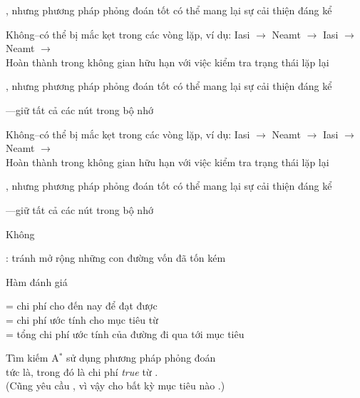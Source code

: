 \documentclass{article}
\def\Astar{A$^*$}
\begin{document}
\begin{huge}
 , nhưng phương pháp phỏng đoán tốt có thể mang lại sự cải thiện đáng kể




 Không--có thể bị mắc kẹt trong các vòng lặp, ví dụ:\nl
Iasi $\rightarrow$ Neamt $\rightarrow$ Iasi $\rightarrow$ Neamt $\rightarrow$\\
Hoàn thành trong không gian hữu hạn với việc kiểm tra trạng thái lặp lại

 , nhưng phương pháp phỏng đoán tốt có thể mang lại sự cải thiện đáng kể

 ---giữ tất cả các nút trong bộ nhớ



 Không--có thể bị mắc kẹt trong các vòng lặp, ví dụ:\nl
Iasi $\rightarrow$ Neamt $\rightarrow$ Iasi $\rightarrow$ Neamt $\rightarrow$\\
Hoàn thành trong không gian hữu hạn với việc kiểm tra trạng thái lặp lại

 , nhưng phương pháp phỏng đoán tốt có thể mang lại sự cải thiện đáng kể

 ---giữ tất cả các nút trong bộ nhớ

 Không


\heading{{\Astar} tìm kiếm}

: tránh mở rộng những con đường vốn đã tốn kém

Hàm đánh giá 

 = chi phí cho đến nay để đạt được \\
 = chi phí ước tính cho mục tiêu từ \\
 = tổng chi phí ước tính của đường đi qua  tới mục tiêu

Tìm kiếm {\Astar} sử dụng phương pháp phỏng đoán \\
tức là,  trong đó  là chi phí \emph{true} từ .\\
(Cũng yêu cầu , vì vậy  cho bất kỳ mục tiêu nào .)


\end{huge}
\end{document}
